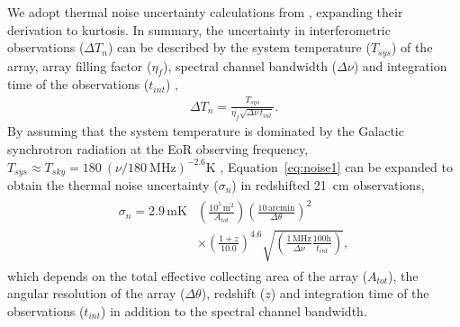 \documentclass[fleqn,usenatbib]{mnras}
\begin{document}
We adopt thermal noise uncertainty calculations from \citet{Watkinson:2014jv}, expanding their derivation to kurtosis.  In summary, the uncertainty in interferometric observations ($\Delta T_n$) can be described by the system temperature ($T_{sys}$) of the array, array filling factor ($\eta_f$), spectral channel bandwidth ($\Delta\nu$) and integration time of the observations ($t_{int}$) \citep{2006PhR...433..181F},
\begin{gather}\label{eq:noise1}
    \Delta T_n = \frac{T_{sys}}{\eta_f\sqrt{\Delta\nu\,t_{int}}}.
\end{gather}
By assuming that the system temperature is dominated by the Galactic synchrotron radiation at the EoR observing frequency, $T_{sys} \approx T_{sky}=180~(\nu/180~\mathrm{MHz})^{-2.6}\mathrm{K}$ \citep{2016MNRAS.455.3890M}, Equation~\ref{eq:noise1} can be expanded to obtain the thermal noise uncertainty ($\sigma_n$) in redshifted 21~cm observations,
\begin{gather}\label{eq:noise2}
\begin{split}
    \sigma_n = 2.9\,\mathrm{mK} 
    &\left(\frac{10^5\,\mathrm{m}^2}{A_{tot}}\right)
    \left(\frac{10\,\mathrm{arcmin}}{\Delta\theta}\right)^2 \\
    &\times \left(\frac{1+z}{10.0}\right)^{4.6}
    \sqrt{\left( \frac{1\,\mathrm{MHz}}{\Delta\nu} \frac{100\mathrm{h}}{t_{int}}\right)},
\end{split}
\end{gather} 
which depends on the total effective collecting area of the array ($A_{tot}$), the angular resolution of the array ($\Delta\theta$), redshift ($z$) and integration time of the observations ($t_{int}$) in addition to the spectral channel bandwidth. 
\end{document}
